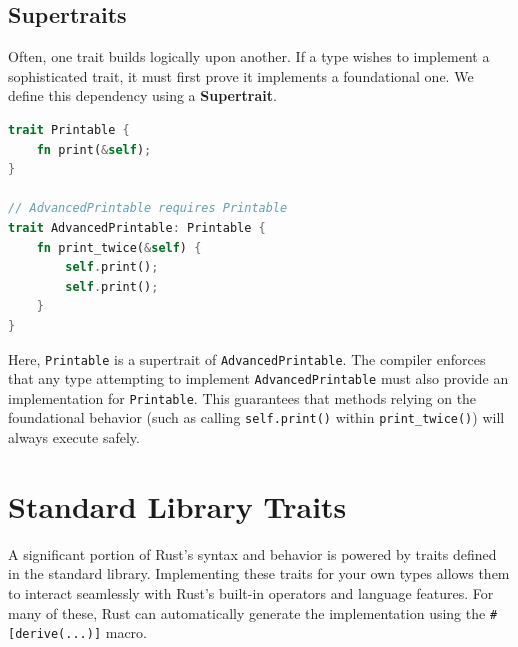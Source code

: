 \subsection*{Supertraits}
Often, one trait builds logically upon another. If a type wishes to implement a sophisticated trait, it must first prove it implements a foundational one. We define this dependency using a \textbf{Supertrait}.

\begin{lstlisting}[language=Rust]
trait Printable {
    fn print(&self);
}

// AdvancedPrintable requires Printable
trait AdvancedPrintable: Printable {
    fn print_twice(&self) {
        self.print();
        self.print();
    }
}
\end{lstlisting}

Here, \texttt{Printable} is a supertrait of \texttt{AdvancedPrintable}. The compiler enforces that any type attempting to implement \texttt{AdvancedPrintable} must also provide an implementation for \texttt{Printable}. This guarantees that methods relying on the foundational behavior (such as calling \texttt{self.print()} within \texttt{print\_twice()}) will always execute safely.

\section*{Standard Library Traits}

A significant portion of Rust's syntax and behavior is powered by traits defined in the standard library. Implementing these traits for your own types allows them to interact seamlessly with Rust's built-in operators and language features. For many of these, Rust can automatically generate the implementation using the \texttt{\#[derive(...)]} macro.

